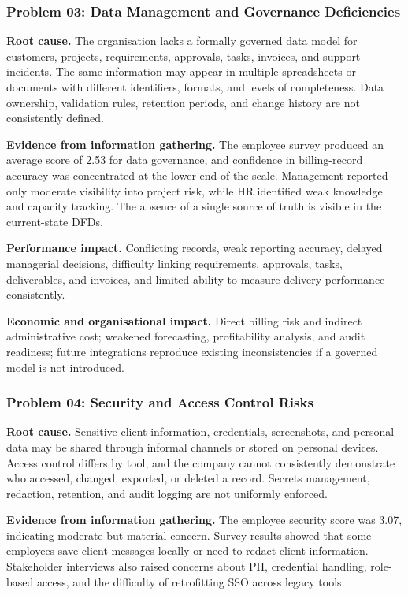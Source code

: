\documentclass[12pt,a4paper]{report}
\begin{document}
\subsubsection{Problem 03: Data Management and Governance Deficiencies}
\textbf{Root cause.} The organisation lacks a formally governed data model for customers,
projects, requirements, approvals, tasks, invoices, and support incidents. The same information
may appear in multiple spreadsheets or documents with different identifiers, formats, and levels
of completeness. Data ownership, validation rules, retention periods, and change history are not
consistently defined.

\textbf{Evidence from information gathering.} The employee survey produced an average score of
2.53 for data governance, and confidence in billing-record accuracy was concentrated at the
lower end of the scale. Management reported only moderate visibility into project risk, while HR
identified weak knowledge and capacity tracking. The absence of a single source of truth is
visible in the current-state DFDs.

\textbf{Performance impact.} Conflicting records, weak reporting accuracy, delayed managerial
decisions, difficulty linking requirements, approvals, tasks, deliverables, and invoices, and
limited ability to measure delivery performance consistently.

\textbf{Economic and organisational impact.} Direct billing risk and indirect administrative
cost; weakened forecasting, profitability analysis, and audit readiness; future integrations
reproduce existing inconsistencies if a governed model is not introduced.

\subsubsection{Problem 04: Security and Access Control Risks}
\textbf{Root cause.} Sensitive client information, credentials, screenshots, and personal data
may be shared through informal channels or stored on personal devices. Access control differs by
tool, and the company cannot consistently demonstrate who accessed, changed, exported, or deleted
a record. Secrets management, redaction, retention, and audit logging are not uniformly
enforced.

\textbf{Evidence from information gathering.} The employee security score was 3.07, indicating
moderate but material concern. Survey results showed that some employees save client messages
locally or need to redact client information. Stakeholder interviews also raised concerns about
PII, credential handling, role-based access, and the difficulty of retrofitting SSO across
legacy tools.
\end{document}
